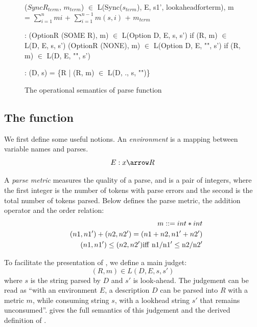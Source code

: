 \begin{figure}[ht]
\begin{center}
{\begin{code}
        ($SyncR_{term}$, $m_{term}$) $\in$ L(Sync($s_{term}$), E, s1', lookaheadforterm),
        m = $\sum_{i= 1}^{n} mi$ + $\sum_{i=1}^{n-1} m(s,i)$ + $m_{term}$

:
  (OptionR (SOME R), m) $\in$ L(Option D, E, s, s')
	if (R, m) $\in$ L(D, E, s, s')
  (OptionR (NONE), m) $\in$ L(Option D, E, "", s')
	if (R, m) $\in$ L(D, E, "", s')

:
  (D, s) = \{R | (R, m) $\in$ L(D, ., s, "")\} 
\end{code}
}
\caption{The operational semantics of parse function}
\label{fig:parse-sem}
\end{center}
\end{figure}

\subsection{The  function}
\label{sec:parse}
We first define some useful notions.
An {\em environment} is a mapping between variable names and parses.
\[E : x \arrow R \]

A {\em parse metric} measures the quality of a parse, and is a 
pair of integers, where the first integer is the number of tokens
with parse errors and the second is the total number of tokens parsed.
Below defines the parse metric, the addition operator and the order
relation:
\begin{eqnarray*}
&&m ::= int * int \\        
&&(n1, n1') + (n2, n2') = (n1 + n2, n1' + n2')  \\ 
&&(n1,n1') \le (n2,n2') \rm{iff}~ n1/n1' \le n2/n2' 
\end{eqnarray*}

To facilitate the presentation of , we define a main
judget:
\[(R, m) \in L(D, E, s, s')\]
where $s$ is the string parsed by $D$ and $s'$ is look-ahead.
The judgement can be read as ``with an environment $E$, a description $D$
can be parsed into $R$ with a metric $m$, while consuming
string $s$, with a lookhead string $s'$ that remains unconsumed''.
 gives the full semantics of this judgement and
the derived definition of .


